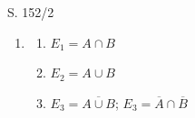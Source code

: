 \begin{Exercise}{S. 152/2}{}
\begin{enumerate}[leftmargin=*]
    \item [2.]\begin{enumerate}[label=\alph*),leftmargin=*]
        \item[a)] {
            $E_{1} = A \cap B$
            }
        \item[b)] {
            $E_{2} = A \cup B$
            }
        \item[c)] {
            $E_{3} = \overline{A \cup B}$; \qquad $E_{3} = \overline{A} \cap \overline{B}$
            }
    \end{enumerate}
\end{enumerate}
\end{Exercise}

